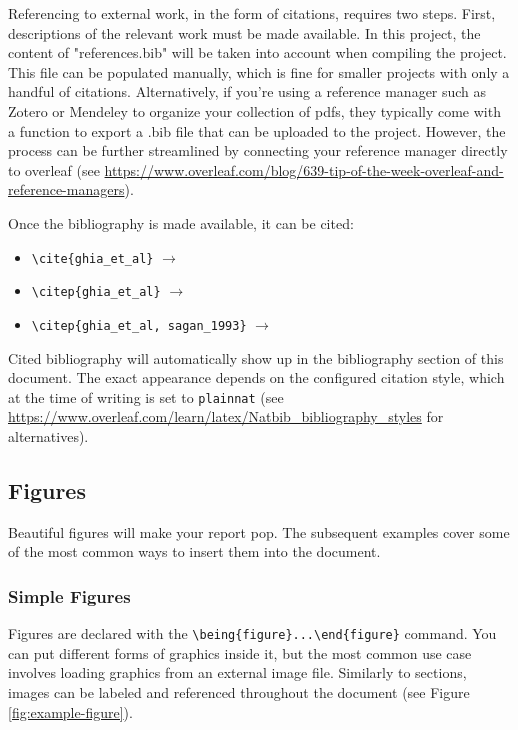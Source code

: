 Referencing to external work, in the form of citations, requires two steps.
First, descriptions of the relevant work must be made available.
In this project, the content of "references.bib" will be taken into account when compiling the project.
This file can be populated manually, which is fine for smaller projects with only a handful of citations.
Alternatively, if you're using a reference manager such as Zotero or Mendeley to organize your collection of pdfs, they typically come with a function to export a .bib file that can be uploaded to the project.
However, the process can be further streamlined by connecting your reference manager directly to overleaf (see \url{https://www.overleaf.com/blog/639-tip-of-the-week-overleaf-and-reference-managers}).

Once the bibliography is made available, it can be cited:

\begin{itemize}
    \item \verb|\cite{ghia_et_al}| $\rightarrow$ \cite{ghia_et_al}
    \item \verb|\citep{ghia_et_al}| $\rightarrow$ \citep{ghia_et_al}
    \item \verb|\citep{ghia_et_al, sagan_1993}| $\rightarrow$ \citep{ghia_et_al, sagan_1993}
\end{itemize}

Cited bibliography will automatically show up in the bibliography section of this document.
The exact appearance depends on the configured citation style, which at the time of writing is set to \verb|plainnat| (see \url{https://www.overleaf.com/learn/latex/Natbib_bibliography_styles} for alternatives).


\subsection{Figures}

Beautiful figures will make your report pop. The subsequent examples cover some of the most common ways to insert them into the document.

\subsubsection{Simple Figures}

Figures are declared with the \verb|\being{figure}...\end{figure}| command.
You can put different forms of graphics inside it, but the most common use case involves loading graphics from an external image file.
Similarly to sections, images can be labeled and referenced throughout the document (see Figure \ref{fig:example-figure}).


